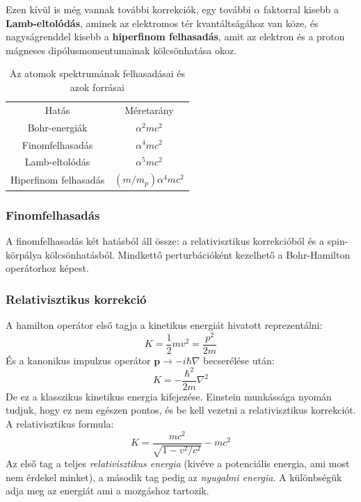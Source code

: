 \documentclass[../main.tex]{subfiles}
\begin{document}
Ezen kívül is még vannak további korrekciók, egy további $\alpha$ faktorral kisebb a \textbf{Lamb-eltolódás}, aminek az elektromos tér kvantáltságához van köze, és nagyságrenddel kisebb a \textbf{hiperfinom felhasadás}, amit az elektron és a proton mágneses dipólusmomentumainak kölcsönhatása okoz.
\begin{table}[H]
    \centering
    \begin{tabular}{|c|c|}
        \hline
        Hatás & Méretarány \\
        Bohr-energiák & $\alpha^2 mc^2$ \\
        \hline
        Finomfelhasadás & $\alpha^4 mc^2$ \\
        \hline
        Lamb-eltolódás & $\alpha^5 mc^2$ \\
        \hline
        Hiperfinom felhasadás & $(m/m_p)\alpha^4 mc^2$ \\
        \hline
    \end{tabular}
    \caption{Az atomok spektrumának felhasadásai és azok forrásai}
\end{table}

\subsubsection{Finomfelhasadás}
A finomfelhasadás két hatásból áll össze: a relativisztikus korrekcióból és a spin-körpálya kölcsönhatásból. Mindkettő perturbációként kezelhető a Bohr-Hamilton operátorhoz képest.

\subsubsection*{Relativisztikus korrekció}
A hamilton operátor első tagja a kinetikus energiát hivatott reprezentálni:
\begin{equation}
    K = \frac{1}{2} m v^2 = \frac{p^2}{2m}
\end{equation}
És a kanonikus impulzus operátor $\mathbf{p} \to -i \hbar \nabla$ becserélése után:
\begin{equation}
    K = - \frac{\hbar^2}{2m} \nabla^2
\end{equation}
De ez a klasszikus kinetikus energia kifejezése. Einstein munkássága nyomán tudjuk, hogy ez nem egészen pontos, és be kell vezetni a relativisztikus korrekciót. A relativisztikus formula:
\begin{equation}
    K = \frac{m c^2}{\sqrt{1 - v^2/c^2}} - m c^2
\end{equation}
Az első tag a teljes \textit{relativisztikus energia} (kivéve a potenciális energia, ami most nem érdekel minket), a második tag pedig az \textit{nyugalmi energia}. A különbségük adja meg az energiát ami a mozgáshoz tartozik.
\end{document}
